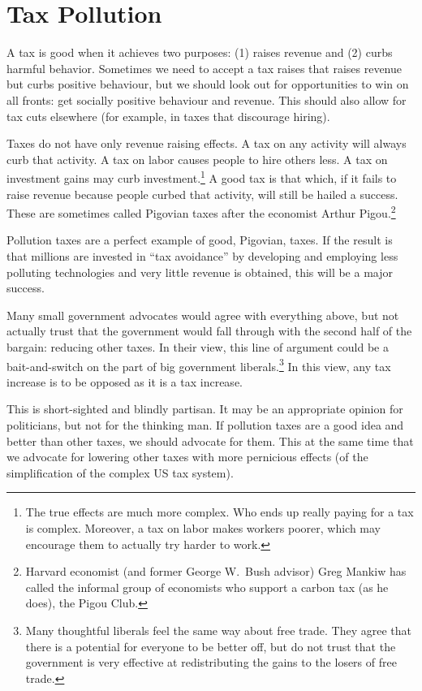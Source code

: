 
\section{Tax Pollution}

A tax is good when it achieves two purposes: (1) raises revenue and (2) curbs
harmful behavior. Sometimes we need to accept a tax raises that raises revenue
but curbs positive behaviour, but we should look out for opportunities to win
on all fronts: get socially positive behaviour and revenue. This should also
allow for tax cuts elsewhere (for example, in taxes that discourage hiring).

Taxes do not have only revenue raising effects. A tax on any activity will
always curb that activity. A tax on labor causes people to hire others
less. A tax on investment gains may curb investment.\footnote{The true effects
are much more complex. Who ends up really paying for a tax is complex.
Moreover, a tax on labor makes workers poorer, which may encourage them to
actually try harder to work.} A good tax is that which, if it fails to raise
revenue because people curbed that activity, will still be hailed a success.
These are sometimes called Pigovian taxes after the economist Arthur
Pigou.\footnote{Harvard economist (and former George W.\ Bush advisor) Greg
Mankiw has called the informal group of economists who support a carbon tax (as
he does), the Pigou Club.}

Pollution taxes are a perfect example of good, Pigovian, taxes. If the result
is that millions are invested in ``tax avoidance'' by developing and employing
less polluting technologies and very little revenue is obtained, this will be a
major success.

Many small government advocates would agree with everything above, but not
actually trust that the government would fall through with the second half of
the bargain: reducing other taxes. In their view, this line of argument could
be a bait-and-switch on the part of big government liberals.\footnote{Many
thoughtful liberals feel the same way about free trade. They agree that there
is a potential for everyone to be better off, but do not trust that the
government is very effective at redistributing the gains to the losers of free
trade.} In this view, any tax increase is to be opposed as it is a tax
increase.

This is short-sighted and blindly partisan. It may be an appropriate opinion
for politicians, but not for the thinking man. If pollution taxes are a good
idea and better than other taxes, we should advocate for them. This at the same
time that we advocate for lowering other taxes with more pernicious effects (of
the simplification of the complex US tax system).


